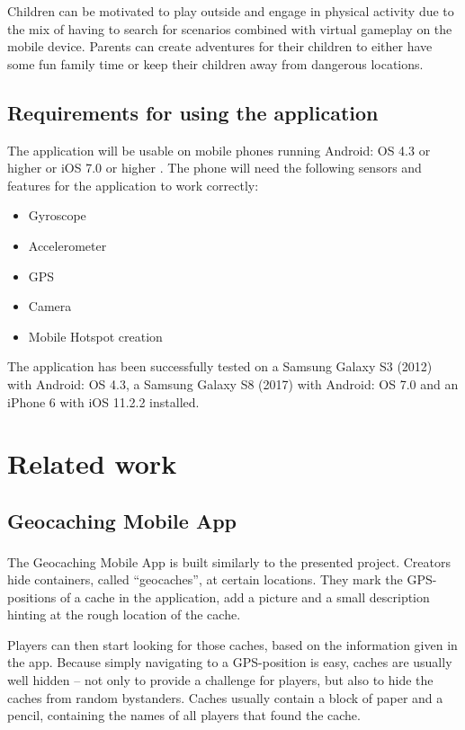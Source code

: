 \documentclass{sigchi-ext}
\begin{document}
Children can be motivated to play outside and engage in physical activity due to the mix of having to search for scenarios combined with virtual gameplay on the mobile device. Parents can create adventures for their children to either have some fun family time or keep their children away from dangerous locations.

\subsection{Requirements for using the application}

The application will be usable on mobile phones running Android: OS 4.3 or higher or iOS 7.0 or higher \cite{unityRequirements}. The phone will need the following sensors and features for the application to work correctly:

\begin{itemize}\compresslist%
	\item Gyroscope
	\item Accelerometer
	\item GPS
	\item Camera
	\item Mobile Hotspot creation \cite{desc:hotspot}
\end{itemize}

The application has been successfully tested on a Samsung Galaxy S3 (2012) with Android: OS 4.3, a Samsung Galaxy S8 (2017) with Android: OS 7.0 and an iPhone 6 with iOS 11.2.2 installed.

\section{Related work}

\subsection{Geocaching Mobile App}

The Geocaching\textsuperscript{\textregistered} Mobile App \cite{app:geocaching} is built similarly to the presented project. Creators hide containers, called ``geocaches'', at certain locations. They mark the GPS-positions of a cache in the application, add a picture and a small description hinting at the rough location of the cache.

Players can then start looking for those caches, based on the information given in the app. Because simply navigating to a GPS-position is easy, caches are usually well hidden -- not only to provide a challenge for players, but also to hide the caches from random bystanders. Caches usually contain a block of paper and a pencil, containing the names of all players that found the cache.
\end{document}
